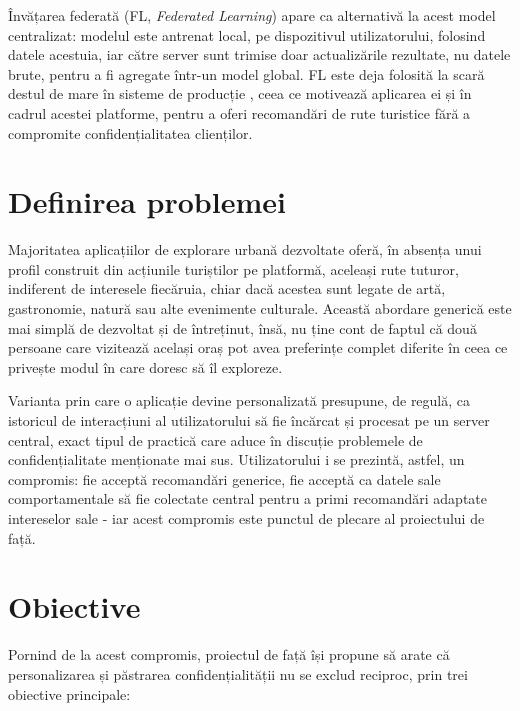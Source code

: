 \documentclass[12pt,a4paper]{report}
\begin{document}
Învățarea federată (FL, \textit{Federated Learning}) apare ca alternativă la acest model centralizat: modelul este antrenat local, pe dispozitivul utilizatorului, folosind datele acestuia, iar către server sunt trimise doar actualizările rezultate, nu datele brute, pentru a fi agregate într-un model global. FL este deja folosită la scară destul de mare în sisteme de producție \cite{bonawitz2019towards,zhang2021survey,li2020applications}, ceea ce motivează aplicarea ei și în cadrul acestei platforme, pentru a oferi recomandări de rute turistice fără a compromite confidențialitatea clienților.

\section{Definirea problemei}

Majoritatea aplicațiilor de explorare urbană dezvoltate oferă, în absența unui profil construit din acțiunile turiștilor pe platformă, aceleași rute tuturor, indiferent de interesele fiecăruia, chiar dacă acestea sunt legate de artă, gastronomie, natură sau alte evenimente culturale. Această abordare generică este mai simplă de dezvoltat și de întreținut, însă, nu ține cont de faptul că două persoane care vizitează același oraș pot avea preferințe complet diferite în ceea ce privește modul în care doresc să îl exploreze.

Varianta prin care o aplicație devine personalizată presupune, de regulă, ca istoricul de interacțiuni al utilizatorului să fie încărcat și procesat pe un server central, exact tipul de practică care aduce în discuție problemele de confidențialitate menționate mai sus. Utilizatorului i se prezintă, astfel, un compromis: fie acceptă recomandări generice, fie acceptă ca datele sale comportamentale să fie colectate central pentru a primi recomandări adaptate intereselor sale - iar acest compromis este punctul de plecare al proiectului de față.

\section{Obiective}

Pornind de la acest compromis, proiectul de față își propune să arate că personalizarea și păstrarea confidențialității nu se exclud reciproc, prin trei obiective principale:
\end{document}
